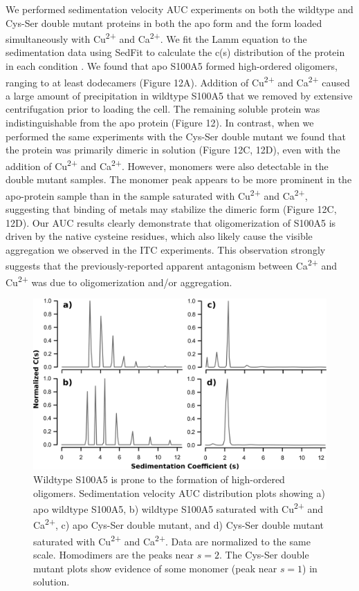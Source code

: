 We performed sedimentation velocity AUC experiments on both the wildtype
and Cys-Ser double mutant proteins in both the apo form and the form
loaded simultaneously with Cu\textsuperscript{2+} and Ca\textsuperscript{2+}.
We fit the Lamm equation to the sedimentation data using SedFit to
calculate the c(s) distribution of the protein in each condition \cite{schuck_size-distribution_2000,brown_macromolecular_2006}.
We found that apo S100A5 formed high-ordered oligomers, ranging to
at least dodecamers (Figure 12A). Addition of Cu\textsuperscript{2+} 
and Ca\textsuperscript{2+} caused a large amount of precipitation
in wildtype S100A5 that we removed by extensive centrifugation prior
to loading the cell. The remaining soluble protein was indistinguishable
from the apo protein (Figure 12). In contrast, when we performed the
same experiments with the Cys-Ser double mutant we found that the
protein was primarily dimeric in solution (Figure 12C, 12D), even with
the addition of Cu\textsuperscript{2+} and Ca\textsuperscript{2+}.
However, monomers were also detectable in the double mutant samples.
The monomer peak appears to be more prominent in the apo-protein sample
than in the sample saturated with Cu\textsuperscript{2+} and Ca\textsuperscript{2+},
suggesting that binding of metals may stabilize the dimeric form (Figure
12C, 12D). Our AUC results clearly demonstrate that oligomerization
of S100A5 is driven by the native cysteine residues, which also likely
cause the visible aggregation we observed in the ITC experiments.
This observation strongly suggests that the previously-reported apparent
antagonism between Ca\textsuperscript{2+} and Cu\textsuperscript{2+} 
was due to oligomerization and/or aggregation.

\begin{figure}
\centering
	\includegraphics{ch4-fig3.png} 
\caption[Wildtype S100A5 forms high-ordered
oligomers]{Wildtype S100A5 is prone to the formation of high-ordered
oligomers. Sedimentation velocity AUC distribution plots showing
a) apo wildtype S100A5, b) wildtype S100A5 saturated with Cu\textsuperscript{2+}
and Ca\textsuperscript{2+}, c) apo Cys-Ser double mutant, and d)
Cys-Ser double mutant saturated with Cu\textsuperscript{2+} and Ca\textsuperscript{2+}.
Data are normalized to the same scale. Homodimers are the peaks near
$s=2$. The Cys-Ser double mutant plots show evidence of some monomer
(peak near $s=1$) in solution.\label{samplefigure}}	
\end{figure}

